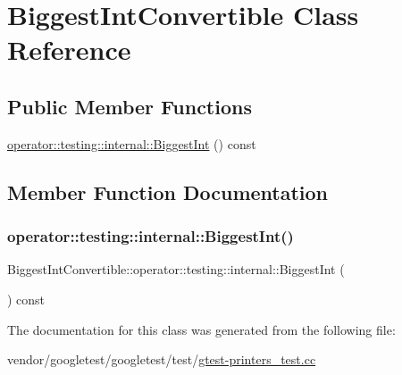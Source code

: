 \hypertarget{class_biggest_int_convertible}{}\section{Biggest\+Int\+Convertible Class Reference}
\label{class_biggest_int_convertible}
\subsection*{Public Member Functions}
\begin{DoxyCompactItemize}
\item 
\hyperlink{class_biggest_int_convertible_aa3dc4bbff87d412758b9adbefa19c6d0}{operator\+::testing\+::internal\+::\+Biggest\+Int} () const
\end{DoxyCompactItemize}


\subsection{Member Function Documentation}
\mbox{\label{class_biggest_int_convertible_aa3dc4bbff87d412758b9adbefa19c6d0}} 
\subsubsection{\texorpdfstring{operator\+::testing\+::internal\+::\+Biggest\+Int()}{operator::testing::internal::BiggestInt()}}
{\footnotesize\ttfamily Biggest\+Int\+Convertible\+::operator\+::testing\+::internal\+::\+Biggest\+Int (\begin{DoxyParamCaption}{ }\end{DoxyParamCaption}) const\hspace{0.3cm}{\ttfamily [inline]}}



The documentation for this class was generated from the following file\+:\begin{DoxyCompactItemize}
\item 
vendor/googletest/googletest/test/\hyperlink{gtest-printers__test_8cc}{gtest-\/printers\+\_\+test.\+cc}\end{DoxyCompactItemize}
